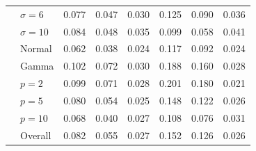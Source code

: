 \begin{tabular}{llrrrrrr}
 & $\sigma=6$ & 0.077 & 0.047 & 0.030 & 0.125 & 0.090 & 0.036 \\
 & $\sigma=10$ & 0.084 & 0.048 & 0.035 & 0.099 & 0.058 & 0.041 \\
 & Normal & 0.062 & 0.038 & 0.024 & 0.117 & 0.092 & 0.024 \\
 & Gamma & 0.102 & 0.072 & 0.030 & 0.188 & 0.160 & 0.028 \\
 & $p=2$ & 0.099 & 0.071 & 0.028 & 0.201 & 0.180 & 0.021 \\
 & $p=5$ & 0.080 & 0.054 & 0.025 & 0.148 & 0.122 & 0.026 \\
 & $p=10$ & 0.068 & 0.040 & 0.027 & 0.108 & 0.076 & 0.031 \\
 & Overall & 0.082 & 0.055 & 0.027 & 0.152 & 0.126 & 0.026 \\
\bottomrule
\end{tabular}
